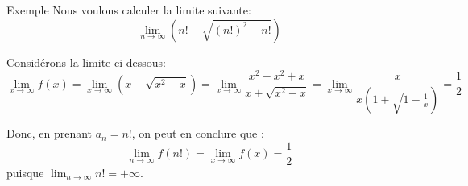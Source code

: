 \documentclass[a4paper]{article}
\begin{document}
\begin{parag}{Exemple}
    Nous voulons calculer la limite suivante: 
    \[\lim_{n \to \infty} \left(n! - \sqrt{\left(n!\right)^2 - n!}\right)\]
    
     Considérons la limite ci-dessous: 
     \[\lim_{x \to \infty} f\left(x\right) = \lim_{x \to \infty} \left(x - \sqrt{x^2 - x}\right) = \lim_{x \to \infty} \frac{x^2 - x^2 + x}{x + \sqrt{x^2 - x}} = \lim_{x \to \infty} \frac{x}{x\left(1 + \sqrt{1 - \frac{1}{x}}\right)} = \frac{1}{2}\]
     
    Donc, en prenant $a_n = n!$, on peut en conclure que : 
    \[\lim_{n \to \infty} f\left(n!\right) = \lim_{x \to \infty} f\left(x\right) = \frac{1}{2}\]
    puisque $\lim_{n \to \infty} n! = +\infty$.
\end{parag}
\end{document}
